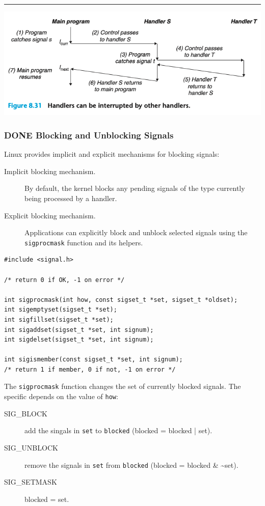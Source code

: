 \documentclass[11pt]{article}
\begin{document}
\noindent\rule{\textwidth}{0.5pt}

\begin{center}
\includegraphics[width=.9\linewidth]{pics/figure8.31-handler-can-be-interrupted-by-other-handler.png}
\end{center}


\subsubsection{{\bfseries\sffamily DONE} Blocking and Unblocking Signals}
\label{sec:org067863a}
Linux provides implicit and explicit mechanisms for blocking signals:\\
\begin{description}
\item[{Implicit blocking mechanism.}] By default, the kernel blocks any pending signals of the type currently being processed by a handler.\\
\item[{Explicit blocking mechanism.}] Applications can explicitly block and unblock selected signals using the \texttt{sigprocmask} function and its helpers.\\
\end{description}


\begin{verbatim}
#include <signal.h>

/* return 0 if OK, -1 on error */

int sigprocmask(int how, const sigset_t *set, sigset_t *oldset);
int sigemptyset(sigset_t *set);
int sigfillset(sigset_t *set);
int sigaddset(sigset_t *set, int signum);
int sigdelset(sigset_t *set, int signum);

int sigismember(const sigset_t *set, int signum);
/* return 1 if member, 0 if not, -1 on error */

\end{verbatim}

The \texttt{sigprocmask} function changes the set of currently blocked signals. The specific depends on the value of \texttt{how}:\\
\begin{description}
\item[{SIG\_BLOCK}] add the singals in \texttt{set} to \texttt{blocked} (blocked = blocked | set).\\
\item[{SIG\_UNBLOCK}] remove the signals in \texttt{set} from \texttt{blocked} (blocked = blocked \& \textasciitilde{}set).\\
\item[{SIG\_SETMASK}] blocked = set.\\
\end{description}
\end{document}
